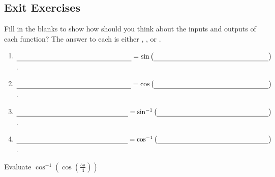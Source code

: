 \subsection*{Exit Exercises} \label{exit-exercises-section-inverse-trig}

\begin{myExit}
	Fill in the blanks to show how should you think about the inputs and outputs of each function? The answer to each is either , , or .
		\begin{enumerate}[itemsep=0.5cm]
			\item $\text{\underline{\phantom{your answer your answer your answer}}} =\sin\left(\text{\underline{\phantom{your answer your answer your answer}}}\right)$.
			\item $\text{\underline{\phantom{your answer your answer your answer}}} =\cos\left(\text{\underline{\phantom{your answer your answer your answer}}}\right)$.
			\item $\text{\underline{\phantom{your answer your answer your answer}}} =\sin^{-1}\left(\text{\underline{\phantom{your answer your answer your answer}}}\right)$.
			\item $\text{\underline{\phantom{your answer your answer your answer}}} =\cos^{-1}\left(\text{\underline{\phantom{your answer your answer your answer}}}\right)$.
		\end{enumerate}
\end{myExit}

\begin{myExit}
	Evaluate $\cos^{-1}\left(\cos\left(\frac{5\pi}{4}\right)\right)$
\end{myExit}
\vfill
\vfill



